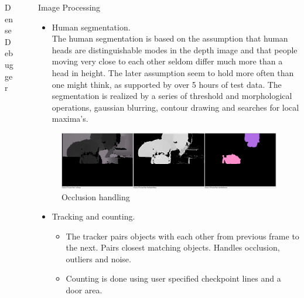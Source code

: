\documentclass[final,hyperref={pdfpagelabels=false}]{beamer}
\begin{document}
\begin{frame}[t]
\begin{columns}[t]
\begin{column}{.465\textwidth}
\begin{block}{Dense Debugger}
\end{block}


\end{column} %

\begin{column}{.03\textwidth}\end{column} %
 
\begin{column}{.465\textwidth} %



\begin{block}{Image Processing}



\begin{itemize}
	\item Human segmentation.\\
	The human segmentation is based on the assumption that human heads are distinguishable modes in the depth image and that people moving very close to each other seldom differ much more than a head in height. The later assumption seem to hold more often than one might think, as supported by over 5 hours of test data. The segmentation is realized by a series of threshold and morphological operations, gaussian blurring, contour drawing and searches for local maxima's. 
\end{itemize}
\begin{figure}
	\includegraphics[width=1.0\linewidth]{KinectSegmentationIllustration_occlusionHandling_horizontal.png}
	\caption{Occlusion handling}
\end{figure}

\begin{itemize}
	\item Tracking and counting.
	\begin{itemize}
		\item{The tracker pairs objects with each other from previous frame to the next. Pairs closest matching objects. Handles occlusion, outliers and noise.}
		\item{Counting is done using user specified checkpoint lines and a door area.}
	\end{itemize}
	

\end{itemize}
\end{block}
\end{column}
\end{columns}
\end{frame}
\end{document}
